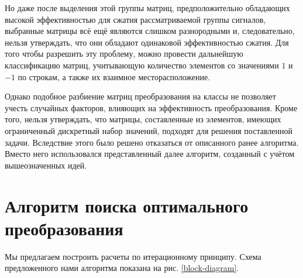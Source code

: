 \documentclass[11pt, oneside, a4paper]{article}
\begin{document}
Но даже после выделения этой группы матриц, предположительно обладающих высокой эффективностью для сжатия рассматриваемой группы сигналов, выбранные матрицы всё ещё являются слишком разнородными и, следовательно, нельзя утверждать, что они обладают одинаковой эффективностью сжатия. Для того чтобы разрешить эту проблему, можно провести дальнейшую классификацию матриц, учитывающую количество элементов со значениями $1$ и $-1$ по строкам, а также их взаимное месторасположение. 

Однако подобное разбиение матриц преобразования на классы не позволяет учесть случайных факторов, влияющих на эффективность преобразования. Кроме того, нельзя утверждать, что матрицы, составленные из элементов, имеющих ограниченный дискретный набор значений, подходят для решения поставленной задачи. Вследствие этого было решено отказаться от описанного ранее алгоритма. Вместо него использовался представленный далее алгоритм, созданный с учётом вышеозначенных идей.

\section{Алгоритм поиска оптимального преобразования}

Мы предлагаем построить расчеты по итерационному принципу. Схема предложенного нами алгоритма показана на рис. \ref{block-diagram}.
\end{document}
